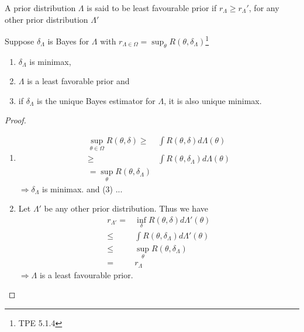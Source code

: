 \begin{definition}
    A prior distribution $\Lambda$ is said to be least favourable  prior
    if $r_\Lambda\geq r_\Lambda'$, for any other prior distribution $\Lambda'$
\end{definition}

\begin{theorem}\label{thm:bayesminimax}
    Suppose $\delta_\Lambda$ is Bayes for $\Lambda$ with 
    $r_{\Lambda\in\Omega}=\sup_\theta{R(\theta,\delta_\Lambda)}$\footnote{
    TPE 5.1.4
    }
    \begin{enumerate}[{(i)}]
        \item $\delta_\Lambda$ is minimax,
        \item $\Lambda$ is a least favorable prior and 
        \item if $\delta_\Lambda$ is the unique Bayes estimator for $\Lambda$, it is also unique minimax.
    \end{enumerate}
\end{theorem}
\begin{proof}
    $~$\\
    \begin{enumerate}[{(i)}]
        \item \begin{align}
            \sup_{\theta\in\Omega}{R(\theta,\delta)}
            \geq& \int{R(\theta,\delta)}d\Lambda(\theta)\\
            \geq& \int{R(\theta,\delta_\Lambda)}d\Lambda(\theta)\\
            =\sup_\theta{R(\theta,\delta_\Lambda)}
        \end{align}
        $\Rightarrow\delta_\Lambda$ is minimax. and (3) ...
        \item Let $\Lambda'$ be any other prior distribution. 
        Thus we have 
        \begin{align}
            r_{\Lambda'}
            =& \inf_\delta{R(\theta,\delta)}d\Lambda'(\theta)\\
            \leq& \int{R(\theta,\delta_\Lambda)}d\Lambda'(\theta)\\
            \leq& \sup_\theta{R(\theta,\delta_\Lambda)}\\
            =& r_\Lambda
        \end{align}
        $\Rightarrow\Lambda$ is a least favourable prior.
    \end{enumerate}
\end{proof}

